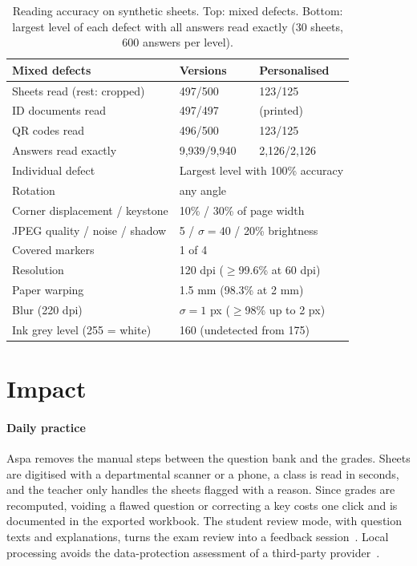 \documentclass[preprint,12pt, a4paper]{elsarticle}
\begin{document}
\begin{table}[!htb]
\centering
\caption{Reading accuracy on synthetic sheets. Top: mixed defects. Bottom: largest level of each defect with all answers read exactly (30 sheets, 600 answers per level).}
\label{tab:accuracy}\vspace{3pt}
\small
\begin{tabular}{p{5.4cm}p{3.3cm}p{3.3cm}}
\toprule
Mixed defects & Versions & Personalised \\
\midrule
Sheets read (rest: cropped) & 497/500 & 123/125 \\
ID documents read & 497/497 & (printed) \\
QR codes read & 496/500 & 123/125 \\
Answers read exactly & 9,939/9,940 & 2,126/2,126 \\
\midrule
Individual defect & \multicolumn{2}{l}{Largest level with 100\% accuracy} \\
\midrule
Rotation & \multicolumn{2}{l}{any angle} \\
Corner displacement / keystone & \multicolumn{2}{l}{10\% / 30\% of page width} \\
JPEG quality / noise / shadow & \multicolumn{2}{l}{5 / $\sigma=40$ / 20\% brightness} \\
Covered markers & \multicolumn{2}{l}{1 of 4} \\
Resolution & \multicolumn{2}{l}{120 dpi ($\geq$99.6\% at 60 dpi)} \\
Paper warping & \multicolumn{2}{l}{1.5 mm (98.3\% at 2 mm)} \\
Blur (220 dpi) & \multicolumn{2}{l}{$\sigma=1$ px ($\geq$98\% up to 2 px)} \\
Ink grey level (255 = white) & \multicolumn{2}{l}{160 (undetected from 175)} \\
\bottomrule
\end{tabular}
\end{table}

\section{Impact}
\label{sec:impact}

\paragraph{Daily practice} Aspa removes the manual steps between the question bank and the grades. Sheets are digitised with a departmental scanner or a phone, a class is read in seconds, and the teacher only handles the sheets flagged with a reason. Since grades are recomputed, voiding a flawed question or correcting a key costs one click and is documented in the exported workbook. The student review mode, with question texts and explanations, turns the exam review into a feedback session~\cite{hattie2007}. Local processing avoids the data-protection assessment of a third-party provider~\cite{gdpr}.
\end{document}
